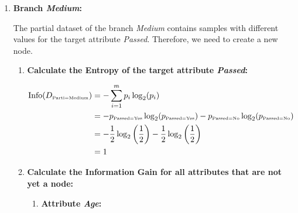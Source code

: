\documentclass[
english,
smallborders
]{i6prcsht}
\newcommand{\OfSpecificValue}[3]{_{\text{\tiny #1#2#3}}}
\begin{document}
\begin{solution}
\begin{enumerate}
\begin{enumerate}
\begin{center}
			            \end{center}

			      \item \textbf{Branch \textit{Medium}:}

			            The partial dataset of the branch \textit{Medium} contains samples with different values for the target attribute \textit{Passed}. Therefore, we need to create a new node.

			            \begin{enumerate}
				            \item \textbf{Calculate the Entropy of the target attribute \textit{Passed}:}

				                  \begin{alignat*}{2}
					                  \text{Info}(D\OfSpecificValue{Parti}{=}{Medium}) & = -\sum_{i=1}^{m}p_i \log_2(p_i)                                                                                                                          \\
					                                                                   & = -p\OfSpecificValue{Passed}{=}{Yes} \log_2(p\OfSpecificValue{Passed}{=}{Yes})- p\OfSpecificValue{Passed}{=}{No} \log_2(p\OfSpecificValue{Passed}{=}{No}) \\
					                                                                   & = -\frac{1}{2} \log_2\left(\frac{1}{2}\right) - \frac{1}{2} \log_2\left(\frac{1}{2}\right)                                                                \\
					                                                                   & = 1                                                                                                                                                       \\
				                  \end{alignat*}

				            \item \textbf{Calculate the Information Gain for all attributes that are not yet a node:}

				                  \begin{enumerate}
					                  \item \textbf{Attribute \textit{Age}:}


\end{enumerate}
\end{enumerate}
\end{enumerate}
\end{enumerate}
\end{solution}
\end{document}
